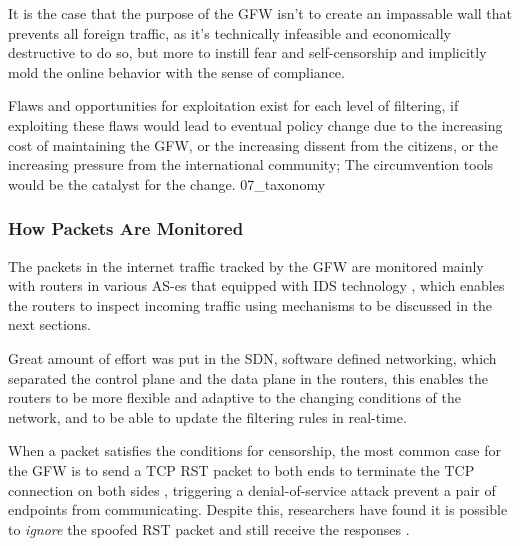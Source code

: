 \documentclass[sigconf]{acmart}
\begin{document}
It is the case that the purpose of the GFW isn't to create an impassable
wall that prevents all foreign traffic, as it's technically infeasible
and economically destructive to do so, but more to instill fear and
self-censorship and implicitly mold the online behavior with the sense
of compliance.

Flaws and opportunities for exploitation exist for each level of
filtering, if exploiting these flaws would lead to eventual policy
change due to the increasing cost of maintaining the GFW, or the
increasing dissent from the citizens, or the increasing pressure from
the international community; The circumvention tools would be the
catalyst for the change. 07\_taxonomy

\hypertarget{how-packets-are-monitored}{%
\subsubsection{How Packets Are
Monitored}\label{how-packets-are-monitored}}

The packets in the internet traffic tracked by the GFW are monitored
mainly with routers in various AS-es that equipped with IDS technology
\cite{03_whereFilter}, which enables the routers to inspect incoming
traffic using mechanisms to be discussed in the next sections.

Great amount of effort was put in the SDN, software defined networking,
which separated the control plane and the data plane in the routers,
this enables the routers to be more flexible and adaptive to the
changing conditions of the network, and to be able to update the
filtering rules in real-time. \cite{15_SDN}

When a packet satisfies the conditions for censorship, the most common
case for the GFW is to send a TCP RST packet to both ends to terminate
the TCP connection on both sides \cite{03_whereFilter}, triggering a
denial-of-service attack prevent a pair of endpoints from communicating.
Despite this, researchers have found it is possible to \emph{ignore} the
spoofed RST packet and still receive the responses \cite{06_ignoring}.

\begin{Shaded}
\begin{Highlighting}[]
 
\end{Highlighting}
\end{Shaded}
\end{document}
